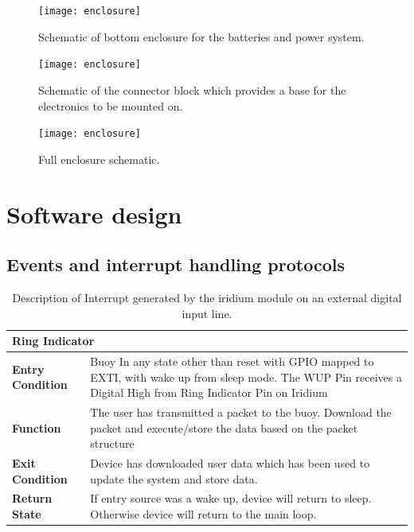 \begin{figure}[H]
    \centering
\texttt{[image: enclosure]}
    \caption{Schematic of bottom enclosure for the batteries and power system.}
    \label{fig:bot_schem}
\end{figure}

\begin{figure}[H]
    \centering
\texttt{[image: enclosure]}
    \caption{Schematic of the connector block which provides a base for the electronics to be mounted on. }
    \label{fig:conblock_schem}
\end{figure}

\begin{figure}[H]
    \centering
\texttt{[image: enclosure]}
    \caption{Full enclosure schematic.}
    \label{fig:full_schem}
\end{figure}

\chapter{Software design}

\section{Events and interrupt handling protocols} 
\label{sec:evt}

\begin{table}[H]
    \centering
    \caption{Description of Interrupt generated by the iridium module on an external digital input line.}
    \begin{tabular}{|m{}|m{}|}
    \hline
        \multicolumn{2}{|l|}{\textbf{Ring Indicator}} \\
        \hline
       \textbf{Entry Condition}  &  Buoy In any state other than reset with GPIO mapped to EXTI, with wake up from sleep mode. The WUP Pin receives a Digital High from Ring Indicator Pin on Iridium\\
       \hline
      \textbf{Function} &  The user has transmitted a packet to the buoy. Download the packet and execute/store the data based on the packet structure\\
       \hline
       \textbf{Exit Condition} & Device has downloaded user data which has been used to update the system and store data.\\
       \hline
       \textbf{Return State}& If entry source was a wake up, device will return to sleep. Otherwise device will return to the main loop.\\
       \hline
    \end{tabular}

    \label{tab:Int_desc_RI}
\end{table}

